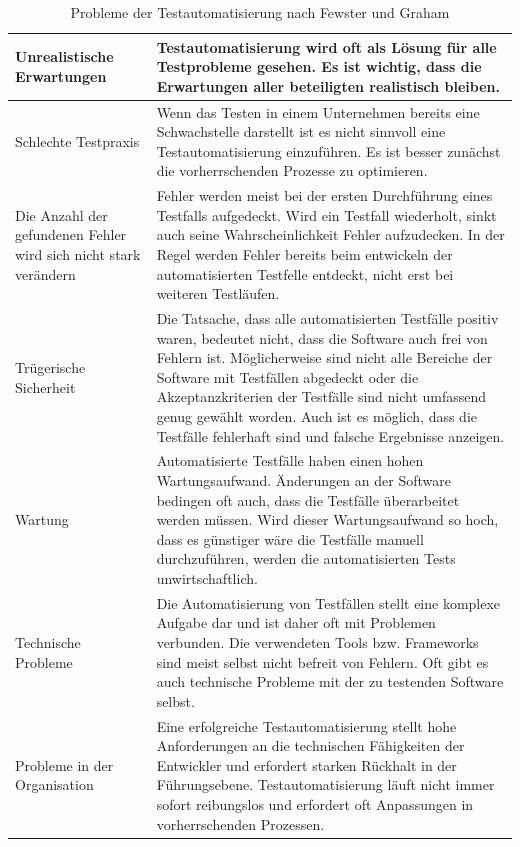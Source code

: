 \begin{table}
\begin{tabular}{p{}|p{}}
\\
\hline 
Unrealistische Erwartungen
&  Testautomatisierung wird oft als Lösung für alle Testprobleme gesehen. Es ist wichtig, dass die Erwartungen aller beteiligten realistisch bleiben. \\ 
\hline 
Schlechte Testpraxis & Wenn das Testen in einem Unternehmen bereits eine Schwachstelle darstellt ist es nicht sinnvoll eine Testautomatisierung einzuführen. Es ist besser zunächst die vorherrschenden Prozesse zu optimieren. \\ 
\hline 
Die Anzahl der gefundenen Fehler wird sich nicht stark verändern & Fehler werden meist bei der ersten Durchführung eines Testfalls aufgedeckt. Wird ein Testfall wiederholt, sinkt auch seine Wahrscheinlichkeit Fehler aufzudecken. In der Regel werden Fehler bereits beim entwickeln der automatisierten Testfelle entdeckt, nicht erst bei weiteren Testläufen. \\
\hline 
Trügerische Sicherheit & Die Tatsache, dass alle automatisierten Testfälle positiv waren, bedeutet nicht, dass die Software auch frei von Fehlern ist. Möglicherweise sind nicht alle Bereiche der Software mit Testfällen abgedeckt oder die Akzeptanzkriterien der Testfälle sind nicht umfassend genug gewählt worden. Auch ist es möglich, dass die Testfälle fehlerhaft sind und falsche Ergebnisse anzeigen. \\
\hline 
Wartung & Automatisierte Testfälle haben einen hohen Wartungsaufwand. Änderungen an der Software bedingen oft auch, dass die Testfälle überarbeitet werden müssen. Wird dieser Wartungsaufwand so hoch, dass es günstiger wäre die Testfälle manuell durchzuführen, werden die automatisierten Tests unwirtschaftlich. \\
\hline 
Technische Probleme & Die Automatisierung von Testfällen stellt eine komplexe Aufgabe dar und ist daher oft mit Problemen verbunden. Die verwendeten Tools bzw. Frameworks sind meist selbst nicht befreit von Fehlern. Oft gibt es auch technische Probleme mit der zu testenden Software selbst. \\
\hline 
Probleme in der Organisation & Eine erfolgreiche Testautomatisierung stellt hohe Anforderungen an die technischen Fähigkeiten der Entwickler und erfordert starken Rückhalt in der Führungsebene. Testautomatisierung läuft nicht immer sofort reibungslos und erfordert oft Anpassungen in vorherrschenden Prozessen. \\

\end{tabular} 
\caption{Probleme der Testautomatisierung nach Fewster und Graham \cite[vgl. S. 10 ff.]{fewster_software_1999}}
\label{tbl:probleme_testautomatisierung}
\end{table}

